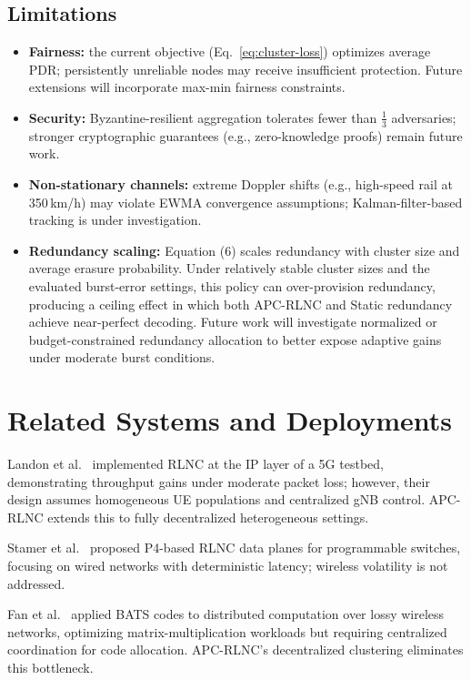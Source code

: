 \documentclass[journal]{IEEEtran}
\begin{document}
\subsection{Limitations}
\begin{itemize}
\item \textbf{Fairness:} the current objective (Eq.~\eqref{eq:cluster-loss}) optimizes average PDR; persistently unreliable nodes may receive insufficient protection. Future extensions will incorporate max-min fairness constraints.
\item \textbf{Security:} Byzantine-resilient aggregation tolerates fewer than $\tfrac{1}{3}$ adversaries; stronger cryptographic guarantees (e.g., zero-knowledge proofs) remain future work.
\item \textbf{Non-stationary channels:} extreme Doppler shifts (e.g., high-speed rail at 350\,km/h) may violate EWMA convergence assumptions; Kalman-filter-based tracking is under investigation.
\item \textbf{Redundancy scaling:} Equation (6) scales redundancy with cluster size and average erasure probability. Under relatively stable cluster sizes and the evaluated burst-error settings, this policy can over-provision redundancy, producing a ceiling effect in which both APC-RLNC and Static redundancy achieve near-perfect decoding. Future work will investigate normalized or budget-constrained redundancy allocation to better expose adaptive gains under moderate burst conditions.
\end{itemize}

\section{Related Systems and Deployments}
\label{sec:related-systems}
Landon et al.\ \cite{landon2025} implemented RLNC at the IP layer of a 5G testbed, demonstrating throughput gains under moderate packet loss; however, their design assumes homogeneous UE populations and centralized gNB control. APC-RLNC extends this to fully decentralized heterogeneous settings.

Stamer et al.\ \cite{stamer2021} proposed P4-based RLNC data planes for programmable switches, focusing on wired networks with deterministic latency; wireless volatility is not addressed.

Fan et al.\ \cite{fan2023} applied BATS codes to distributed computation over lossy wireless networks, optimizing matrix-multiplication workloads but requiring centralized coordination for code allocation. APC-RLNC's decentralized clustering eliminates this bottleneck.
\end{document}
